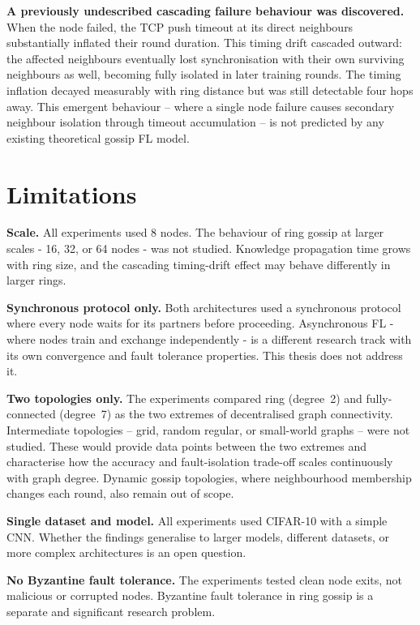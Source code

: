 \documentclass[12pt]{report}
\begin{document}
\textbf{A previously undescribed cascading failure behaviour was discovered.}
When the node failed, the TCP push timeout at its direct neighbours substantially
inflated their round duration. This timing drift cascaded outward: the affected
neighbours eventually lost synchronisation with their own surviving neighbours
as well, becoming fully isolated in later training rounds. The timing inflation
decayed measurably with ring distance but was still detectable four hops away.
This emergent behaviour -- where a single node failure causes secondary neighbour
isolation through timeout accumulation -- is not predicted by any existing
theoretical gossip FL model.

\section{Limitations}

\textbf{Scale.} All experiments used 8 nodes. The behaviour of ring gossip at
larger scales - 16, 32, or 64 nodes - was not studied. Knowledge propagation
time grows with ring size, and the cascading timing-drift effect may behave
differently in larger rings.

\textbf{Synchronous protocol only.} Both architectures used a synchronous
protocol where every node waits for its partners before proceeding. Asynchronous
FL - where nodes train and exchange independently - is a different research
track with its own convergence and fault tolerance properties. This thesis does
not address it.

\textbf{Two topologies only.} The experiments compared ring (degree~2) and
fully-connected (degree~7) as the two extremes of decentralised graph
connectivity. Intermediate topologies -- grid, random regular, or small-world
graphs -- were not studied. These would provide data points between the two
extremes and characterise how the accuracy and fault-isolation trade-off scales
continuously with graph degree. Dynamic gossip topologies, where neighbourhood
membership changes each round, also remain out of scope.

\textbf{Single dataset and model.} All experiments used CIFAR-10 with a simple
CNN. Whether the findings generalise to larger models, different datasets, or more
complex architectures is an open question.

\textbf{No Byzantine fault tolerance.} The experiments tested clean node exits,
not malicious or corrupted nodes. Byzantine fault tolerance in ring gossip is a
separate and significant research problem.
\end{document}
